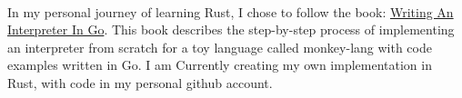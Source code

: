 \documentclass[a4paper]{MagicalCV}
\begin{document}
\begin{minipage}[t]{0.66\textwidth}

 \\

In my personal journey of learning Rust, I chose to follow the book: \href{https://interpreterbook.com/}{Writing An Interpreter In Go}. This book describes the step-by-step process of implementing an interpreter from scratch for a toy language called monkey-lang with code examples written in Go. I am Currently creating my own implementation in Rust, with code in my personal github account.

\sectionsep

\end{minipage} 

\printbibliography
\end{document}
